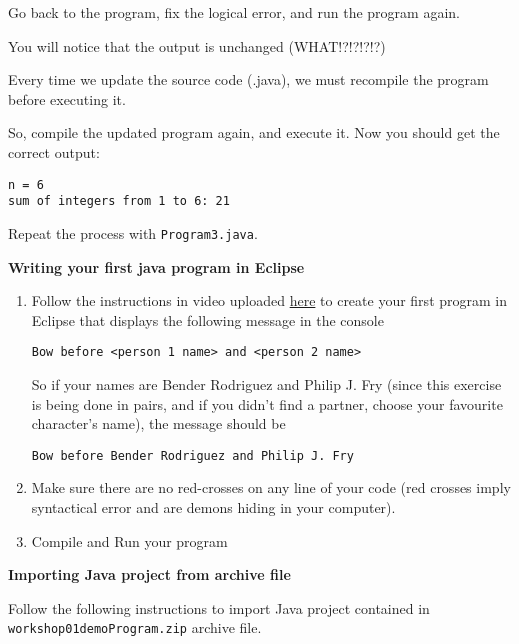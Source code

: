 \begin{questions}
Go back to the program, fix the logical error, and run the program again.

You will notice that the output is unchanged (WHAT!?!?!?!?)

Every time we update the source code (.java), we must recompile the program before executing it.

So, compile the updated program again, and execute it. Now you should get the correct output:

\begin{lstlisting}[numbers=none]
n = 6
sum of integers from 1 to 6: 21
\end{lstlisting}

Repeat the process with \texttt{Program3.java}.

\question \textbf{Writing your first java program in Eclipse} \vskip 0.5cm

\begin{enumerate}
\item Follow the instructions in video uploaded \href{https://www.youtube.com/watch?v=8DcIQcmwuSE}{here} to create your first program in Eclipse that displays the following message in the console

\begin{verbatim}
Bow before <person 1 name> and <person 2 name>
\end{verbatim}

So if your names are Bender Rodriguez and Philip J. Fry (since this exercise is being done in pairs, and if you didn't find a partner, choose your favourite character's name), the message should be

\begin{verbatim}
Bow before Bender Rodriguez and Philip J. Fry
\end{verbatim}

\item Make sure there are no red-crosses on any line of your code (red crosses imply syntactical error and are demons hiding in your computer).

\item Compile and Run your program
\end{enumerate}

\newpage

\question \textbf{Importing Java project from archive file} \vskip 0.5cm

Follow the following instructions to import Java project contained in \texttt{workshop01demoProgram.zip} archive file.


\end{questions}
